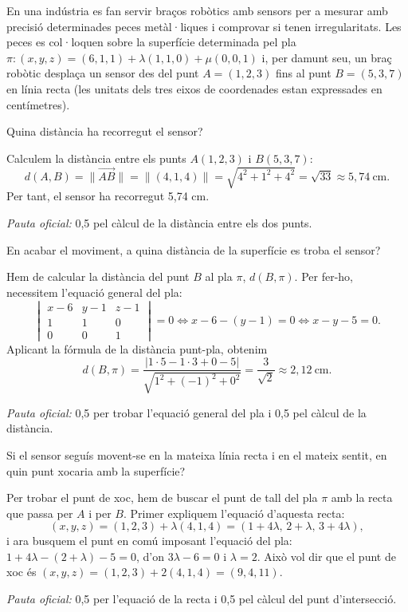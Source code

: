 En una indústria es fan servir braços robòtics amb sensors per a mesurar amb precisió determinades peces
metàl·liques i comprovar si tenen irregularitats. Les peces es col·loquen sobre la superfície determinada
pel pla $\pi\colon(x,y,z)=(6,1,1)+\lambda(1,1,0)+\mu(0,0,1)$ i, per damunt seu, un braç robòtic desplaça un
sensor des del punt $A=(1,2,3)$ fins al punt $B=(5,3,7)$ en línia recta (les unitats dels tres eixos de
coordenades estan expressades en centímetres).

\begin{apartats}

Quina distància ha recorregut el sensor?

\begin{solucio}
Calculem la distància entre els punts $A(1,2,3)$ i $B(5,3,7)$:
\[
d(A,B)=\bigl\|\overrightarrow{AB}\bigr\|=\|(4,1,4)\|=\sqrt{4^2+1^2+4^2}=\sqrt{33}\approx5{,}74\ \text{cm}.
\]
Per tant, el sensor ha recorregut 5,74 cm.

\textit{Pauta oficial:} 0,5 pel càlcul de la distància entre els dos punts.
\end{solucio}

En acabar el moviment, a quina distància de la superfície es troba el sensor?

\begin{solucio}
Hem de calcular la distància del punt $B$ al pla $\pi$, $d(B,\pi)$. Per fer-ho, necessitem l'equació general
del pla:
\[
\begin{vmatrix}x-6&y-1&z-1\\1&1&0\\0&0&1\end{vmatrix}=0\iff x-6-(y-1)=0\iff x-y-5=0 .
\]
Aplicant la fórmula de la distància punt-pla, obtenim
\[
d(B,\pi)=\frac{|1\cdot5-1\cdot3+0-5|}{\sqrt{1^2+(-1)^2+0^2}}=\frac{3}{\sqrt2}\approx2{,}12\ \text{cm}.
\]

\textit{Pauta oficial:} 0,5 per trobar l'equació general del pla i 0,5 pel càlcul de la distància.
\end{solucio}

Si el sensor seguís movent-se en la mateixa línia recta i en el mateix sentit, en quin punt xocaria amb la
superfície?

\begin{solucio}
Per trobar el punt de xoc, hem de buscar el punt de tall del pla $\pi$ amb la recta que passa per $A$ i per
$B$. Primer expliquem l'equació d'aquesta recta:
\[
(x,y,z)=(1,2,3)+\lambda(4,1,4)=(1+4\lambda,\,2+\lambda,\,3+4\lambda),
\]
i ara busquem el punt en comú imposant l'equació del pla: $1+4\lambda-(2+\lambda)-5=0$, d'on $3\lambda-6=0$ i
$\lambda=2$. Això vol dir que el punt de xoc és $(x,y,z)=(1,2,3)+2(4,1,4)=(9,4,11)$.

\textit{Pauta oficial:} 0,5 per l'equació de la recta i 0,5 pel càlcul del punt d'intersecció.
\end{solucio}

\end{apartats}

